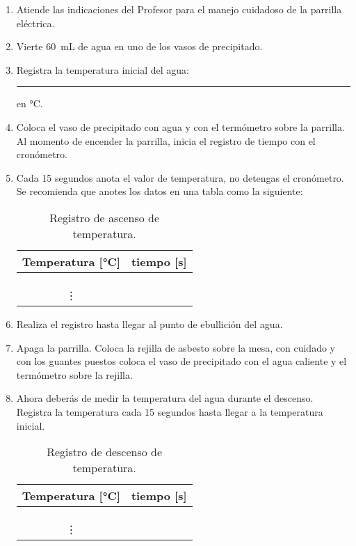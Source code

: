 \documentclass[14pt]{extarticle}
\begin{document}
\begin{enumerate}
\item Atiende las indicaciones del Profesor para el manejo cuidadoso de la parrilla eléctrica.
\item Vierte \SI{60}{\milli\liter} de agua en uno de los vasos de precipitado.
\item Registra la temperatura inicial del agua: \rule{2cm}{0.1mm} en \si{\degreeCelsius}.
\item Coloca el vaso de precipitado con agua y con el termómetro sobre la parrilla. Al momento de encender la parrilla, inicia el registro de tiempo con el cronómetro.
\item Cada \num{15} segundos anota el valor de temperatura, no detengas el cronómetro. Se recomienda que anotes los datos en una tabla como la siguiente:
\begin{table}[H]
\centering
\begin{tabular}{| c | c |} \hline
Temperatura [\si{\degreeCelsius}] & tiempo [\si{\second}] \\ \hline
 & \\ \hline
 & \\ \hline
 & \\ \hline
\vdots & \\ \hline
\end{tabular}
\caption{Registro de ascenso de temperatura.}
\end{table}
\item Realiza el registro hasta llegar al punto de ebullición del agua.
\item Apaga la parrilla. Coloca la rejilla de asbesto sobre la mesa, con cuidado y con los guantes puestos coloca el vaso de precipitado con el agua caliente y el termómetro sobre la rejilla.
\item Ahora deberás de medir la temperatura del agua durante el descenso. Registra la temperatura cada \num{15} segundos hasta llegar a la temperatura inicial.
\begin{table}[H]
\centering
\begin{tabular}{| c | c |} \hline
Temperatura [\si{\degreeCelsius}] & tiempo [\si{\second}] \\ \hline
 & \\ \hline
 & \\ \hline
 & \\ \hline
\vdots & \\ \hline
\end{tabular}
\caption{Registro de descenso de temperatura.}
\end{table}
\end{enumerate}
\end{document}
